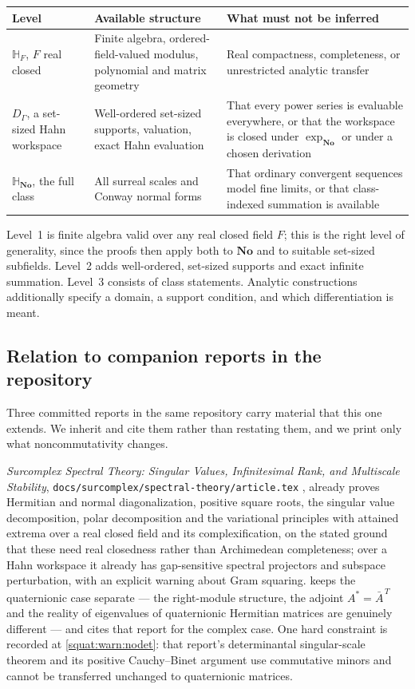 \documentclass[11pt,letterpaper]{article}
\numberwithin{equation}{section}
\theoremstyle{definition}
\theoremstyle{remark}
\newcommand{\No}{\mathbf{No}}
\newcommand{\SQ}{\mathbb H_{\No}}
\newcommand{\HF}{\mathbb H_F}
\begin{document}
\begin{center}\small
\begin{tabular}{L{0.16\textwidth}L{0.36\textwidth}L{0.40\textwidth}}
\toprule
Level & Available structure & What must not be inferred\\
\midrule
$\HF$, $F$ real closed & Finite algebra, ordered-field-valued modulus, polynomial and
matrix geometry & Real compactness, completeness, or unrestricted analytic transfer\\
$D_\Gamma$, a set-sized Hahn workspace & Well-ordered set-sized supports, valuation,
exact Hahn evaluation & That every power series is evaluable everywhere, or that the
workspace is closed under $\exp_{\No}$ or under a chosen derivation\\
$\SQ$, the full class & All surreal scales and Conway normal forms & That ordinary
convergent sequences model fine limits, or that class-indexed summation is available\\
\bottomrule
\end{tabular}
\end{center}

Level~1 is finite algebra valid over any real closed field $F$; this is the right level
of generality, since the proofs then apply both to $\No$ and to suitable set-sized
subfields. Level~2 adds well-ordered, set-sized supports and exact infinite summation.
Level~3 consists of class statements. Analytic constructions additionally specify a
domain, a support condition, and which differentiation is meant.

\subsection{Relation to companion reports in the repository}\label{squat:sub:companions}
Three committed reports in the same repository carry material that this one extends. We
inherit and cite them rather than restating them, and we print only what
noncommutativity changes.

\emph{Surcomplex Spectral Theory: Singular Values, Infinitesimal Rank, and Multiscale
Stability}, \texttt{docs/surcomplex/spectral-theory/article.tex} \cite{RepoSpec},
already proves Hermitian and normal diagonalization, positive square roots, the singular
value decomposition, polar decomposition and the variational principles with attained
extrema over a real closed field and its complexification, on the stated ground that
these need real closedness rather than Archimedean completeness; over a Hahn workspace it
already has gap-sensitive spectral projectors and subspace perturbation, with an explicit
warning about Gram squaring.  keeps the quaternionic case
separate --- the right-module structure, the adjoint $A^*=\bar A^{\,T}$ and the reality
of eigenvalues of quaternionic Hermitian matrices are genuinely different --- and cites
that report for the complex case. One hard constraint is recorded at
\cref{squat:warn:nodet}: that report's determinantal singular-scale theorem and its
positive Cauchy--Binet argument use commutative minors and cannot be transferred
unchanged to quaternionic matrices.
\end{document}
